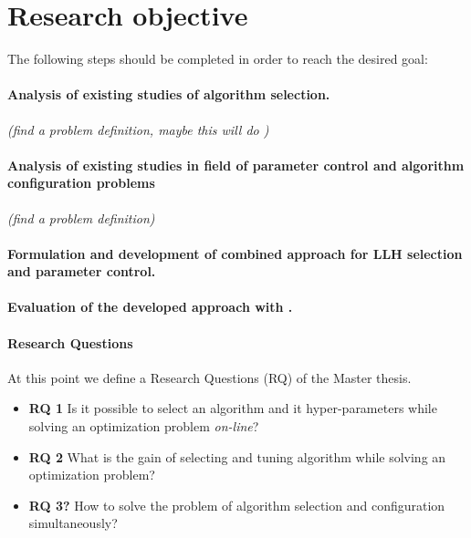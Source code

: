 \section{Research objective}
The following steps should be completed in order to reach the desired goal:

\paragraph{Analysis of existing studies of algorithm selection.} \textit{(find a problem definition, maybe this will do \cite{kerschke2019automated})}

\paragraph{Analysis of existing studies in field of parameter control and algorithm configuration problems} \textit{(find a problem definition)} \cite{lavesson2006quantifying}

\paragraph{Formulation and development of combined approach for LLH selection and parameter control.}

\paragraph{Evaluation of the developed approach with .}

\paragraph{Research Questions} At this point we define a Research Questions (RQ) of the Master thesis.

\begin{itemize}
	\item \textbf{RQ 1} Is it possible to select an algorithm and it hyper-parameters while solving an optimization problem \textit{on-line}?

	\item \textbf{RQ 2} What is the gain of selecting and tuning algorithm while solving an optimization problem?

	\item \textbf{RQ 3?} How to solve the problem of algorithm selection and configuration simultaneously?
	
\end{itemize}



